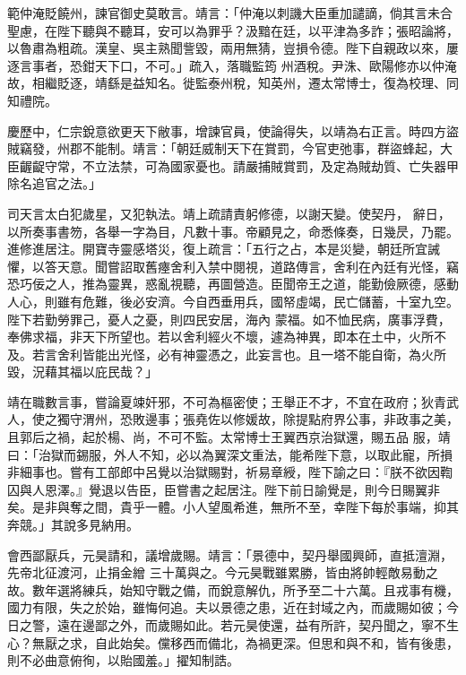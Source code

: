 \begin{pinyinscope}
 範仲淹貶饒州，諫官御史莫敢言。靖言：「仲淹以刺譏大臣重加譴謫，倘其言未合聖慮，在陛下聽與不聽耳，安可以為罪乎？汲黯在廷，以平津為多詐；張昭論將，以魯肅為粗疏。漢皇、吳主熟聞訾毀，兩用無猜，豈損令德。陛下自親政以來，屢逐言事者，恐鉗天下口，不可。」疏入，落職監筠
 州酒稅。尹洙、歐陽修亦以仲淹故，相繼貶逐，靖繇是益知名。徙監泰州稅，知英州，遷太常博士，復為校理、同知禮院。



 慶歷中，仁宗銳意欲更天下敝事，增諫官員，使論得失，以靖為右正言。時四方盜賊竊發，州郡不能制。靖言：「朝廷威制天下在賞罰，今官吏弛事，群盜蜂起，大臣齷齪守常，不立法禁，可為國家憂也。請嚴捕賊賞罰，及定為賊劫質、亡失器甲除名追官之法。」



 司天言太白犯歲星，又犯執法。靖上疏請責躬修德，以謝天變。使契丹，
 辭日，以所奏事書笏，各舉一字為目，凡數十事。帝顧見之，命悉條奏，日幾昃，乃罷。進修進居注。開寶寺靈感塔災，復上疏言：「五行之占，本是災變，朝廷所宜誡懼，以答天意。聞嘗詔取舊瘞舍利入禁中閱視，道路傳言，舍利在內廷有光怪，竊恐巧佞之人，推為靈異，惑亂視聽，再圖營造。臣聞帝王之道，能勤儉厥德，感動人心，則雖有危難，後必安濟。今自西垂用兵，國帑虛竭，民亡儲蓄，十室九空。陛下若勤勞罪己，憂人之憂，則四民安居，海內
 蒙福。如不恤民病，廣事浮費，奉佛求福，非天下所望也。若以舍利經火不壞，遽為神異，即本在土中，火所不及。若言舍利皆能出光怪，必有神靈憑之，此妄言也。且一塔不能自衛，為火所毀，況藉其福以庇民哉？」



 靖在職數言事，嘗論夏竦奸邪，不可為樞密使；王舉正不才，不宜在政府；狄青武人，使之獨守渭州，恐敗邊事；張堯佐以修媛故，除提點府界公事，非政事之美，且郭后之禍，起於楊、尚，不可不監。太常博士王翼西京治獄還，賜五品
 服，靖曰：「治獄而錫服，外人不知，必以為翼深文重法，能希陛下意，以取此寵，所損非細事也。嘗有工部郎中呂覺以治獄賜對，祈易章綬，陛下諭之曰：『朕不欲因鞫囚與人恩澤。』覺退以告臣，臣嘗書之起居注。陛下前日諭覺是，則今日賜翼非矣。是非與奪之間，貴乎一體。小人望風希進，無所不至，幸陛下每於事端，抑其奔競。」其說多見納用。



 會西鄙厭兵，元昊請和，議增歲賜。靖言：「景德中，契丹舉國興師，直抵澶淵，先帝北征渡河，止捐金繒
 三十萬與之。今元昊戰雖累勝，皆由將帥輕敵易動之故。數年選將練兵，始知守戰之備，而銳意解仇，所予至二十六萬。且戎事有機，國力有限，失之於始，雖悔何追。夫以景德之患，近在封域之內，而歲賜如彼；今日之警，遠在邊鄙之外，而歲賜如此。若元昊使還，益有所許，契丹聞之，寧不生心？無厭之求，自此始矣。儻移西而備北，為禍更深。但思和與不和，皆有後患，則不必曲意俯徇，以貽國羞。」擢知制誥。




\end{pinyinscope}
